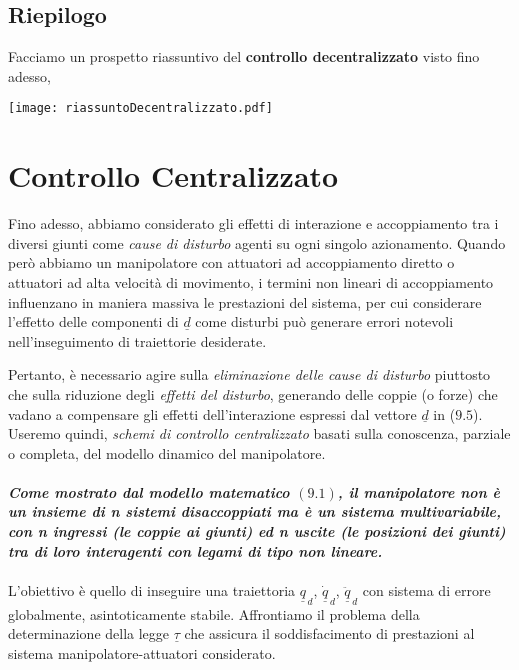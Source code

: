 \subsection{Riepilogo}
Facciamo un prospetto riassuntivo del \textbf{controllo decentralizzato} visto fino adesso,
\begin{center}
	\texttt{[image: riassuntoDecentralizzato.pdf]}
\end{center}

\section{Controllo Centralizzato}
Fino adesso, abbiamo considerato gli effetti di interazione e accoppiamento tra i diversi giunti come \emph{cause di disturbo} agenti su ogni singolo azionamento. Quando però abbiamo un manipolatore con attuatori ad accoppiamento diretto o attuatori ad alta velocità di movimento, i termini non lineari di accoppiamento influenzano in maniera massiva le prestazioni del sistema, per cui considerare l'effetto delle componenti di $\underline{d}$ come disturbi può generare errori notevoli nell'inseguimento di traiettorie desiderate.

Pertanto, è necessario agire sulla \emph{eliminazione delle cause di disturbo} piuttosto che sulla riduzione degli \emph{effetti del disturbo}, generando delle coppie (o forze) che vadano a compensare gli effetti dell'interazione espressi dal vettore $\underline{d}$ in ($9.5$). Useremo quindi, \emph{schemi di controllo centralizzato} basati sulla conoscenza, parziale o completa, del modello dinamico del manipolatore.

\paragraph{}
\textbf{\textit{Come mostrato dal modello matematico $(9.1)$, il manipolatore non è un insieme di n sistemi disaccoppiati ma è un sistema multivariabile, con n ingressi (le coppie ai giunti) ed n uscite (le posizioni dei giunti) tra di loro interagenti con legami di tipo non lineare.}}

\paragraph{}
L'obiettivo è quello di inseguire una traiettoria $\underline{q}_{\,d}$, $\dot{\underline{q}}_{\,d}$, $\ddot{\underline{q}}_{\,d}$ con sistema di errore globalmente, asintoticamente stabile. Affrontiamo il problema della determinazione della legge $\underline{\tau}$ che assicura il soddisfacimento di prestazioni al sistema manipolatore-attuatori considerato.

